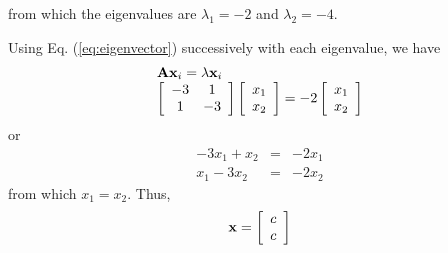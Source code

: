 from which the eigenvalues are $\lambda_1 = -2$ and $\lambda_2 = -4$.

Using Eq. (\ref{eq:eigenvector}) successively with each eigenvalue, we have
\[
\begin{array}{l}
 {\bf{Ax}}_i  = \lambda {\bf{x}}_i  \\
 \left[ {\begin{array}{*{20}c}
   { - 3} & 1  \\
   1 & { - 3}  \\
\end{array}} \right]\left[ {\begin{array}{*{20}c}
   {x_1 }  \\
   {x_2 }  \\
\end{array}} \right] =  - 2\left[ {\begin{array}{*{20}c}
   {x_1 }  \\
   {x_2 }  \\
\end{array}} \right] \\
 \end{array}
\]
or
\begin{eqnarray*}
-3x_1+x_2 & = & -2x_1 \\
x_1-3x_2 & = & -2x_2
\end{eqnarray*}
from which $x_1 = x_2$. Thus,
\begin{equation}\label{ex1:ev1}
{\bf{x}} = \left[ {\begin{array}{*{20}c}
   c  \\
   c  \\
\end{array}} \right]
\end{equation}
